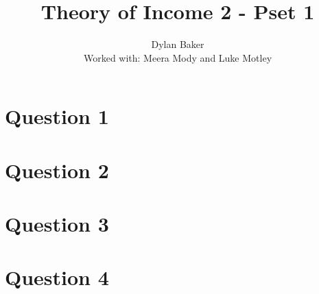 \documentclass[10pt]{article}
\title{Theory of Income 2 - Pset 1}
\author{Dylan Baker
\\ Worked with: Meera Mody and Luke Motley}
\date{}
\begin{document}
\maketitle

\tableofcontents

\section{Question 1}


\pagebreak

\section{Question 2}


\pagebreak

\section{Question 3}


\pagebreak

\section{Question 4}

\end{document}
